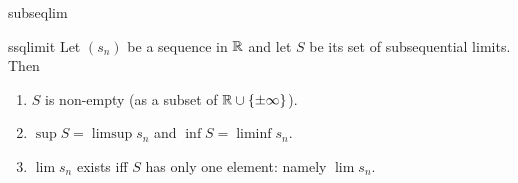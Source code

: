 \begin{examples}{}{subseqlim}
\begin{enumerate}
% 
% 
\end{enumerate}
\end{examples}


\goodbreak


\begin{thm}{}{ssqlimit}
Let $(s_n)$ be a sequence in $\mathbb{R}$ and let $S$ be its set of subsequential limits. Then
\begin{enumerate}
  \item $S$ is non-empty (as a subset of $\mathbb{R}\cup\{\pm\infty\}$).
  \item $\sup S=\limsup s_n$ and $\inf S=\liminf s_n$.
  \item $\lim s_n$ exists iff $S$ has only one element: namely $\lim s_n$.
\end{enumerate}
\end{thm}

